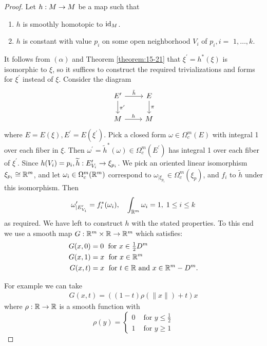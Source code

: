 \begin{proof}
  Let $h : M \rightarrow  M$ be a map such that
  \begin{enumerate}
    \item[($\alpha$)] $h$ is smoothly homotopic to ${\mathrm{id}}_{M}$.
    \item[($\beta$)] $h$ is constant with value ${p}_{i}$ on some open neighborhood $V_i$ of ${p}_{i},i =$  $1,\ldots,k$.
  \end{enumerate}
  
  It follows from $( \alpha )$ and Theorem \ref{theorem:15-21} that ${\xi }^{\prime } = {h}^*( \xi )$ is isomorphic to $\xi$, so it 
  suffices to construct the required trivializations and forms for ${\xi }^{\prime }$ instead of $\xi$. Consider 
  the diagram
  \[\begin{tikzcd}
    E' \rar{\tilde{h}}\dar{\pi'} & E \dar{\pi} \\
    M \rar{h} & M
  \end{tikzcd}\]
  where $E = E( \xi ),{E}^{\prime } = E( {\xi }^{\prime })$. Pick a closed form $\omega  \in  {\Omega }_{c}^{m}( E)$ 
  with integral 1 over each fiber in $\xi$. Then ${\omega }^{\prime}={\widetilde{h}}^*( \omega) \in {\Omega}_{c}^{m}({E}^{\prime})$ 
  has integral 1 over each fiber of ${\xi }^{\prime }$. Since $h(V_i)  = p_i,\widetilde{h}:{E}_{V_i}^{\prime } \rightarrow  {\xi }_{{p}_{i}}$. 
  We pick an oriented linear isomorphism ${\xi }_{{p}_{i}} \cong  {{\ensuremath{\mathbb{R}}}}^{m}$, and let ${\omega }_{i} \in  {\Omega }_{c}^{m}( {{\mathbb{R}}}^{m})$ 
  correspond to ${\omega }_{\mid {\xi }_{{p}_{i}}} \in  {\Omega }_{c}^{m}( {\xi }_{p})$, and $f_i$ to $\widetilde{h}$ under 
  this isomorphism. Then
  \[
    {\omega }_{\mid {E}_{V_i}^{\prime }}^{\prime } = f_i^*( {\omega }_{i}),\quad 
    \int_{{\mathbb{R}}^m}{\omega}_{i} = 1,\;1 \leq  i \leq  k
  \]
  as required. We have left to construct $h$ with the stated properties. To this end we use a smooth map $G:{\mathbb{R}}^m\times{\ensuremath{\mathbb{R}}}\rightarrow{\ensuremath{\mathbb{R}}}^m$ 
  which satisfies:
  \begin{align*}
    G( {x,0})  & = 0\;\text{ for }x \in  \tfrac{1}{2}{D}^{m} \\
    G( {x,1})  & = x\;\text{ for }x \in  {\ensuremath{\mathbb{R}}}^{m} \\
    G( {x,t})  & = x\;\text{ for }t \in  {\ensuremath{\mathbb{R}}}\text{ and }x \in {\ensuremath{\mathbb{R}}}^{m}- {D}^{m}.
  \end{align*}
  
  For example we can take
  \begin{align}\label{eq:21-6}
    G( {x,t})  = ( {( {1- t}) \rho (\|x\|) + t}) x
  \end{align}
  where $\rho:{\mathbb{R}}\rightarrow{\ensuremath{\mathbb{R}}}$ is a smooth function with
  \[
    \rho(y) = 
    \left\{\begin{array}{ll} 
      0 & \text{ for } y \leq  \frac{1}{2} \\  
      1 & \text{ for } y \geq  1 
    \end{array}\right.
  \]
  

\end{proof}
